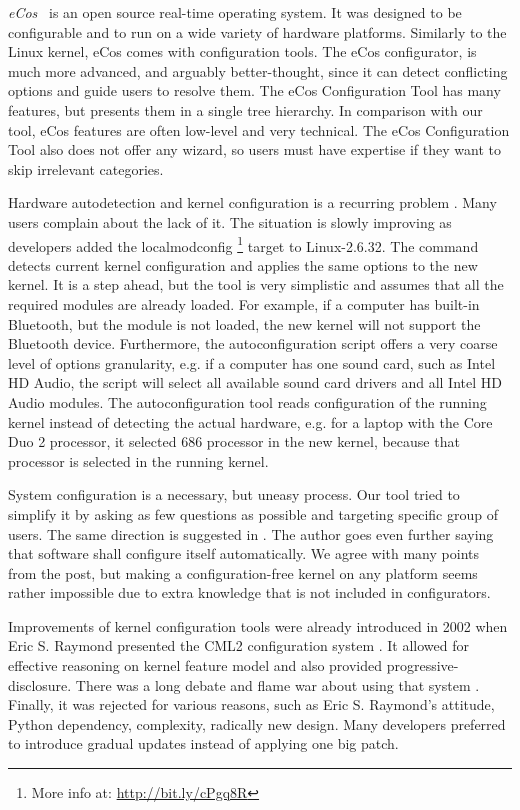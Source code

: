 \documentclass{chi2009}
\begin{document}
\textit{eCos}~\cite{veer:ecos:2000} is an open source real-time operating system. It was designed to be configurable and to run on a wide variety of hardware platforms. Similarly to the Linux kernel, eCos comes with configuration tools. The eCos configurator, is much more advanced, and arguably better-thought, since it can detect conflicting options and guide users to resolve them. The eCos Configuration Tool has many features, but presents them in a single tree hierarchy. In comparison with our tool, eCos features are often low-level and very technical. The eCos Configuration Tool also does not offer any wizard, so users must have expertise if they want to skip irrelevant categories.

Hardware autodetection and kernel configuration is a recurring problem \cite{debian:config:2010,soft32:config:2007}. Many users complain about the lack of it. The situation is slowly improving as developers added the \textsf{localmodconfig} \footnote{More info at: \url{http://bit.ly/cPgq8R}} target to Linux-2.6.32. The command detects current kernel configuration and applies the same options to the new kernel. It is a step ahead, but the tool is very simplistic and assumes that all the required modules are already loaded. For example, if a computer has built-in Bluetooth, but the module is not loaded, the new kernel will not support the Bluetooth device. Furthermore, the autoconfiguration script offers a very coarse level of options granularity, e.g. if a computer has one sound card, such as Intel HD Audio, the script will select all available sound card drivers and all Intel HD Audio modules. The autoconfiguration tool reads configuration of the running kernel instead of detecting the actual hardware, e.g. for a laptop with the Core Duo 2 processor, it selected 686 processor in the new kernel, because that processor is selected in the running kernel.

System configuration is a necessary, but uneasy process. Our tool tried to simplify it by asking as few questions as possible and targeting specific group of users. The same direction is suggested in \cite{spillers:config:2010}. The author goes even further saying that software shall configure itself automatically. We agree with many points from the post, but making a configuration-free kernel on any platform seems rather impossible due to extra knowledge that is not included in configurators.

Improvements of kernel configuration tools were already introduced in 2002 when Eric S. Raymond presented the CML2 configuration system \cite{raymond:cml2:2000}. It allowed for effective reasoning on kernel feature model and also provided progressive-disclosure. There was a long debate and flame war about using that system \cite{kerneltrap:linux:2002}. Finally, it was rejected for various reasons, such as Eric S. Raymond's attitude, Python dependency, complexity, radically new design. Many developers preferred to introduce gradual updates instead of applying one big patch.
\end{document}
